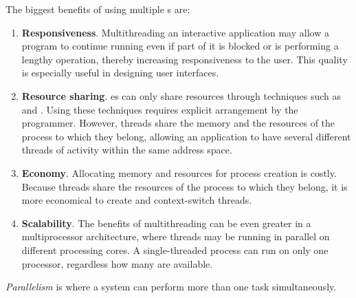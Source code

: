The biggest benefits of using multiple s are:
\begin{enumerate}[noitemsep]
\item \textbf{Responsiveness}.
  Multithreading an interactive application may allow a program to continue running even if part of it is blocked or is performing a lengthy operation, thereby increasing responsiveness to the user.
  This quality is especially useful in designing user interfaces.
\item \textbf{Resource sharing}.
  es can only share resources through techniques such as  and .
  Using these techniques requires explicit arrangement by the programmer.
  However, threads share the memory and the resources of the process to which they belong, allowing an application to have several different threads of activity within the same address space.
\item \textbf{Economy}.
  Allocating memory and resources for process creation is costly.
  Because threads share the resources of the process to which they belong, it is more economical to create and context-switch threads.
\item \textbf{Scalability}.
  The benefits of multithreading can be even greater in a multiprocessor architecture, where threads may be running in parallel on different processing cores.
  A single-threaded process can run on only one processor, regardless how many are available.
\end{enumerate}

\begin{definition}[Parallelism]\label{def:Parallelism}
  \emph{Parallelism} is where a system can perform more than one task simultaneously.
\end{definition}


